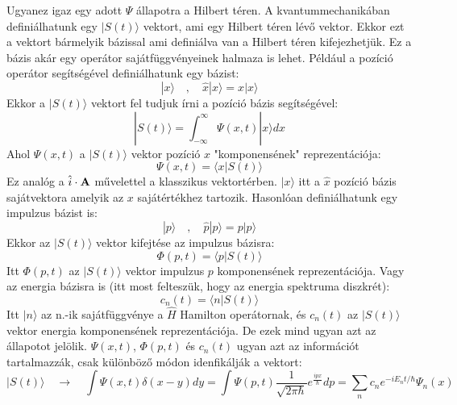 \documentclass[../main.tex]{subfiles}
\begin{document}
Ugyanez igaz egy adott $\Psi$ állapotra a Hilbert téren. A kvantummechanikában definiálhatunk egy $| S(t) \rangle$ vektort, ami egy Hilbert téren lévő vektor. Ekkor ezt a vektort bármelyik 
bázissal ami definiálva van a Hilbert téren kifejezhetjük. Ez a bázis akár egy operátor sajátfüggvényeinek halmaza is lehet. Például a pozíció operátor segítségével definiálhatunk egy bázist:
\begin{equation}
    | x \rangle \quad , \quad \hat{x} | x \rangle = x | x \rangle
\end{equation}
Ekkor a $| S(t) \rangle$ vektort fel tudjuk írni a pozíció bázis segítségével:
\begin{equation}
    | S(t) \rangle = \int_{-\infty}^{\infty} \Psi(x, t) | x \rangle dx
\end{equation}
Ahol $\Psi(x, t)$ a $| S(t) \rangle$ vektor pozíció $x$ "komponensének" reprezentációja:
\begin{equation}
    \Psi(x, t) = \langle x | S(t) \rangle
\end{equation}
Ez analóg a $\hat{i} \cdot \bold{A}$ művelettel a klasszikus vektortérben. $|x\rangle$ itt a $\hat{x}$ pozíció bázis sajátvektora amelyik az $x$ sajátértékhez tartozik. Hasonlóan definiálhatunk egy impulzus bázist is:
\begin{equation}
    | p \rangle \quad , \quad \hat{p} | p \rangle = p | p \rangle
\end{equation}
Ekkor az $| S(t) \rangle$ vektor kifejtése az impulzus bázisra:
\begin{equation}
    \Phi (p,t) = \langle p | S(t) \rangle
\end{equation}
Itt $\Phi(p,t)$ az $| S(t) \rangle$ vektor impulzus $p$ komponensének reprezentációja. Vagy az energia bázisra is (itt most felteszük, hogy az energia spektruma diszkrét):
\begin{equation}
    c_n (t) = \langle n | S(t) \rangle
\end{equation}
Itt $| n \rangle$ az n.-ik  sajátfüggvénye a $\hat{H}$ Hamilton operátornak, és $c_n(t)$ az $| S(t) \rangle$ vektor energia komponensének reprezentációja. De ezek mind ugyan azt az állapotot jelölik.
$\Psi(x,t)$, $\Phi(p,t)$ és $c_n(t)$ ugyan azt az információt tartalmazzák, csak különböző módon idenfikálják a vektort:
\begin{equation}
    | S(t) \rangle \quad \rightarrow \quad \int \Psi(x, t)\delta(x-y) dy = \int \Psi(p, t) \frac{1}{\sqrt{2 \pi \hbar}} e^{\frac{i p x}{\hbar}} dp = \sum_n c_n e^{-i E_n t / \hbar} \Psi_n(x)
\end{equation}
\end{document}
